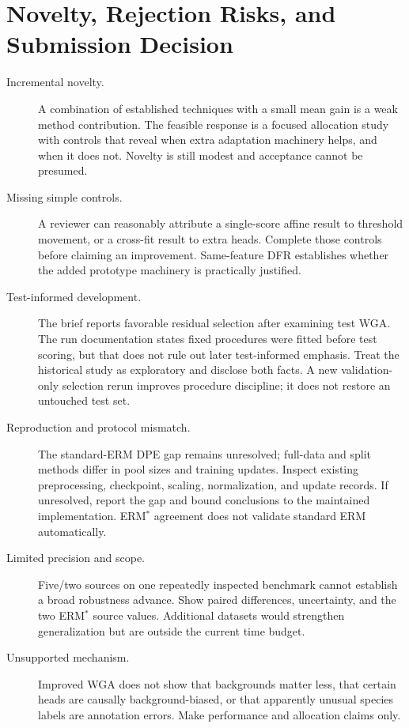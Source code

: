 \documentclass[runningheads]{llncs}
\begin{document}
\section{Novelty, Rejection Risks, and Submission Decision}
\begin{description}
\item[Incremental novelty.] A combination of established techniques with a small mean gain is a weak method contribution. The feasible response is a focused allocation study with controls that reveal when extra adaptation machinery helps, and when it does not. Novelty is still modest and acceptance cannot be presumed.
\item[Missing simple controls.] A reviewer can reasonably attribute a single-score affine result to threshold movement, or a cross-fit result to extra heads. Complete those controls before claiming an improvement. Same-feature DFR establishes whether the added prototype machinery is practically justified.
\item[Test-informed development.] The brief reports favorable residual selection after examining test WGA. The run documentation states fixed procedures were fitted before test scoring, but that does not rule out later test-informed emphasis. Treat the historical study as exploratory and disclose both facts. A new validation-only selection rerun improves procedure discipline; it does not restore an untouched test set.
\item[Reproduction and protocol mismatch.] The standard-ERM DPE gap remains unresolved; full-data and split methods differ in pool sizes and training updates. Inspect existing preprocessing, checkpoint, scaling, normalization, and update records. If unresolved, report the gap and bound conclusions to the maintained implementation. ERM$^*$ agreement does not validate standard ERM automatically.
\item[Limited precision and scope.] Five/two sources on one repeatedly inspected benchmark cannot establish a broad robustness advance. Show paired differences, uncertainty, and the two ERM$^*$ source values. Additional datasets would strengthen generalization but are outside the current time budget.
\item[Unsupported mechanism.] Improved WGA does not show that backgrounds matter less, that certain heads are causally background-biased, or that apparently unusual species labels are annotation errors. Make performance and allocation claims only.
\end{description}
\end{document}
